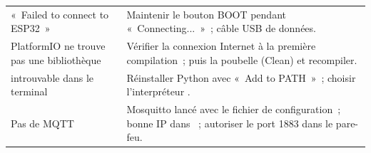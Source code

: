 \begin{tabularx}{\linewidth}{P{5cm}L}
«~Failed to connect to ESP32~» & Maintenir le bouton BOOT pendant «~Connecting...~»~; câble USB de données. \\
PlatformIO ne trouve pas une bibliothèque & Vérifier la connexion Internet à la première compilation~; puis la poubelle (Clean) et recompiler. \\
 introuvable dans le terminal & Réinstaller Python avec «~Add to PATH~»~; choisir l'interpréteur . \\
Pas de MQTT & Mosquitto lancé avec le fichier de configuration~; bonne IP dans ~; autoriser le port 1883 dans le pare-feu. \\
\end{tabularx}


